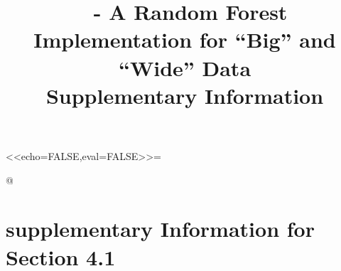 \documentclass[11pt]{article}
\title{\cursedforest\ - A Random Forest Implementation for ``Big'' and ``Wide'' Data \\
Supplementary Information}
\author{}
\date{}
\begin{document}
\maketitle






<<echo=FALSE,eval=FALSE>>=


@ 


\section{supplementary Information for Section 4.1}
\end{document}
